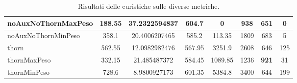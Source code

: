 \begin{table}
\begin{tabular}{l|c|c|c|c|c|c|c}
noAuxNoThornMaxPeso & \textbf{188.55}      & \textbf{37.2322594837}                                           & \textbf{604.7}                                                              & \textbf{0}                                                                 & \textbf{938}                                                       & 651                                                                     & \textbf{0}                                                             \\ \hline
\rowcolor[HTML]{EFEFEF} 
noAuxNoThornMinPeso & 358.1                & 20.4006207465                                                    & 585.2                                                                       & 113.35                                                                     & 1809                                                                 & 683                                                                     & 5                                                                      \\ \hline
thorn               & 562.55               & 12.0982982476                                                    & 567.95                                                                      & 3251.9                                                                     & 2608                                                                  & 646                                                                     & 125                                                                    \\ \hline
\rowcolor[HTML]{EFEFEF} 
thornMaxPeso        & 332.15               & 21.485487372                                                     & 584.45                                                                      & 1089.85                                                                    & 1236                                                                 & \textbf{921}                                                            & 31                                                                     \\ \hline
thornMinPeso        & 728.6                & 8.9800927173                                                     & 601.35                                                                      & 5384.8                                                                     & 3400                                                                 & 644                                                                     & 199                                                                   
\end{tabular}
\caption{Risultati delle euristiche sulle diverse metriche.}
\label{tab:results}
\end{table}

